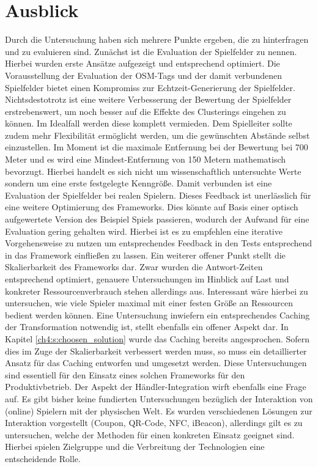 \section{Ausblick}

Durch die Untersuchung haben sich mehrere Punkte ergeben, die zu hinterfragen und zu evaluieren sind. Zunächst ist die Evaluation der Spielfelder zu nennen. Hierbei wurden erste Ansätze aufgezeigt und entsprechend optimiert. Die Vorausstellung der Evaluation der OSM-Tags und der damit verbundenen Spielfelder bietet einen Kompromiss zur Echtzeit-Generierung der Spielfelder. Nichtsdestotrotz ist eine weitere Verbesserung der Bewertung der Spielfelder erstrebenswert, um noch besser auf die Effekte des Clusterings eingehen zu können. Im Idealfall werden diese komplett vermieden. Dem Spielleiter sollte zudem mehr Flexibilität ermöglicht werden, um die gewünschten Abstände selbst einzustellen. Im Moment ist die maximale Entfernung bei der Bewertung bei 700 Meter und es wird eine Mindest-Entfernung von 150 Metern  mathematisch bevorzugt. Hierbei handelt es sich nicht um wissenschaftlich untersuchte Werte sondern um eine erste festgelegte Kenngröße.
Damit verbunden ist eine Evaluation der Spielfelder bei realen Spielern. Dieses Feedback ist unerlässlich für eine weitere Optimierung des Frameworks. Dies könnte auf Basis einer optisch aufgewertete Version des Beispiel Spiels passieren, wodurch der Aufwand für eine Evaluation gering gehalten wird.
Hierbei ist es zu empfehlen eine iterative Vorgehensweise zu nutzen um entsprechendes Feedback in den Tests entsprechend in das Framework einfließen zu lassen.
Ein weiterer offener Punkt stellt die Skalierbarkeit des Frameworks dar. Zwar wurden die Antwort-Zeiten entsprechend optimiert, genauere Untersuchungen im Hinblick auf Last und konkreter Ressourcenverbrauch stehen allerdings aus. Interessant wäre hierbei zu untersuchen, wie viele Spieler maximal mit einer festen Größe an Ressourcen bedient werden können. Eine Untersuchung inwiefern ein entsprechendes Caching der Transformation notwendig ist, stellt ebenfalls ein offener Aspekt dar. In Kapitel \ref{ch4:s:choosen_solution} wurde das Caching bereits angesprochen. Sofern dies im Zuge der Skalierbarkeit verbessert werden muss, so muss ein detaillierter Ansatz für das Caching entworfen und umgesetzt werden. 
Diese Untersuchungen sind essentiell für den Einsatz eines solchen Frameworks für den Produktivbetrieb.
Der Aspekt der Händler-Integration wirft ebenfalls eine Frage auf. Es gibt bisher keine fundierten Untersuchungen bezüglich der Interaktion von (online) Spielern mit der physischen Welt. Es wurden verschiedenen Lösungen zur Interaktion vorgestellt (Coupon, QR-Code, NFC, iBeacon), allerdings gilt es zu untersuchen, welche der Methoden für einen konkreten Einsatz geeignet sind. Hierbei spielen Zielgruppe und die Verbreitung der Technologien eine entscheidende Rolle.
